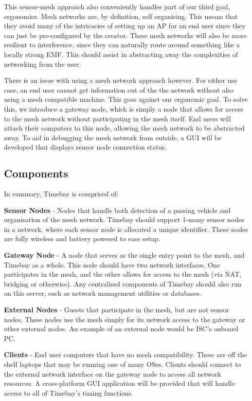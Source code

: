\documentclass[journal]{IEEEtran}
\begin{document}
This sensor-mesh approach also conveniently handles part of our third goal, ergonomics. Mesh networks are, by definition, self organising. This means that they avoid many of the intricacies of setting up an AP for an end user since they can just be pre-configured by the creator. These mesh networks will also be more resilient to interference, since they can naturally route around something like a locally strong EMF. This should assist in abstracting away the complexities of networking from the user.

There is an issue with using a mesh network approach however. For either use case, an end user cannot get information out of the the network without also using a mesh compatible machine. This goes against our ergonomic goal. To solve this, we introduce a gateway node, which is simply a node that allows for access to the mesh network without participating in the mesh itself. End users will attach their computers to this node, allowing the mesh network to be abstracted away. To aid in 
debugging the mesh network from outside, a GUI will be developed that displays sensor node connection status.

\subsection{Components}
In summary, Timebay is comprised of:

\textbf{Sensor Nodes} - Nodes that handle both detection of a passing vehicle and organisation of the mesh network. Timebay should support 1-many sensor nodes in a network, where each sensor node is allocated a unique identifier. These nodes are fully wireless and battery powered to ease setup.

\textbf{Gateway Node} - A node that serves as the single entry point to the mesh, and Timebay as a whole. This node should have two network interfaces. One participates in the mesh, and the other allows for access to the mesh (via NAT, bridging or otherwise). Any centralised components of Timebay should also run on this server, such as network management utilities or databases.

\textbf{External Nodes} - Guests that participate in the mesh, but are not sensor nodes. These nodes use the mesh simply for its network access to the gateway or other external nodes. An example of an external node would be ISC's onboard PC.

\textbf{Clients} - End user computers that have no mesh compatibility. These are off the shelf laptops that may be running one of many OSes. Clients should connect to the external network interface on the gateway node to access all network resources. A cross-platform GUI application will be provided that will handle access to all of Timebay's timing functions.
\end{document}
